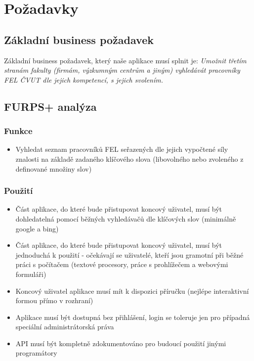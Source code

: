 \section{Požadavky}
\subsection{Základní business požadavek}
Základní business požadavek, který naše aplikace musí splnit je: \textit{Umožnit třetím stranám fakulty (firmám, výzkumným centrům a jiným) vyhledávát pracovníky FEL ČVUT dle jejich kompetencí, s jejich svolením.}
\subsection{FURPS+ analýza} \label{furps}
\subsubsection{Funkce}
\begin{itemize}
    \item Vyhledat seznam pracovníků FEL seřazených dle jejich vypočtené síly znalosti na základě zadaného klíčového slova (libovolného nebo zvoleného z definované množiny slov)
\end{itemize}
\subsubsection{Použití}
\begin{itemize}
    \item Část aplikace, do které bude přistupovat koncový uživatel, musí být dohledatelná pomocí běžných vyhledávačů dle klíčových slov (minimálně google a bing)
    \item Část aplikace, do které bude přistupovat koncový uživatel, musí být jednoduchá k použití - očekávají se uživatelé, kteří jsou gramotní při běžné práci s počítačem (textové procesory, práce s prohlížečem a webovými formuláři)
    \item Koncový uživatel aplikace musí mít k dispozici příručku (nejlépe interaktivní formou přímo v rozhraní)
    \item Aplikace musí být dostupná bez přihlášení, login se toleruje jen pro případná speciální administrátorská práva
    \item API musí být kompletně zdokumentováno pro budoucí použití jinými programátory
\end{itemize}
